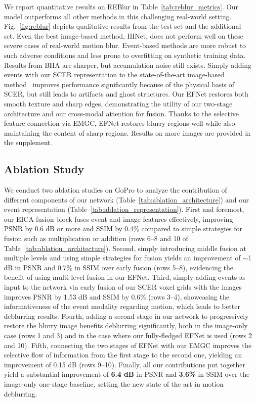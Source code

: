 \documentclass[runningheads]{llncs}
\newcommand{\PAR}[1]{\noindent{\bf #1}}
\newlength \g
\begin{document}
\PAR{REBlur dataset.}
We report quantitative results on REBlur in Table~\ref{tab:reblur_metrics}. Our model outperforms all other methods in this challenging real-world setting. Fig.~\ref{fig:reblur} depicts qualitative results from the test set and the additional set. Even the best image-based method, HINet, does not perform well on these severe cases of real-world motion blur. Event-based methods are more robust to such adverse conditions and less prone to overfitting on synthetic training data. Results from BHA are sharper, but accumulation noise still exists. Simply adding events with our SCER representation to the state-of-the-art image-based method~\cite{chen2021hinet} improves performance significantly because of the physical basis of SCER, but still leads to artifacts and ghost structures. Our EFNet restores both smooth texture and sharp edges, demonstrating the utility of our two-stage architecture and our cross-modal attention for fusion. Thanks to the selective feature connection via EMGC, EFNet restores blurry regions well while also maintaining the content of sharp regions. Results on more images are provided in the supplement.

\subsection{Ablation Study}

We conduct two ablation studies on GoPro to analyze the contribution of different components of our network (Table~\ref{tab:ablation_architecture}) and our event representation (Table~\ref{tab:ablation_representation}).
First and foremost, our EICA fusion block fuses event and image features effectively, improving PSNR by 0.6 dB or more and SSIM by 0.4\% compared to simple strategies for fusion such as multiplication or addition (rows 6--8 and 10 of Table~\ref{tab:ablation_architecture}). Second, simply introducing middle fusion at multiple levels and using simple strategies for fusion yields an improvement of $\sim$1 dB in PSNR and 0.7\% in SSIM over early fusion (rows 5--8), evidencing the benefit of using multi-level fusion in our EFNet. Third, simply adding events as input to the network via early fusion of our SCER voxel grids with the images improves PSNR by 1.53 dB and SSIM by 0.6\% (rows 3--4), showcasing the informativeness of the event modality regarding motion, which leads to better deblurring results. Fourth, adding a second stage in our network to progressively restore the blurry image benefits deblurring significantly, both in the image-only case (rows 1 and 3) and in the case where our fully-fledged EFNet is used (rows 2 and 10). Fifth, connecting the two stages of EFNet with our EMGC improves the selective flow of information from the first stage to the second one, yielding an improvement of 0.15 dB (rows 9--10). Finally, all our contributions put together yield a substantial improvement of \textbf{6.4 dB} in PSNR and \textbf{3.6\%} in SSIM over the image-only one-stage baseline, setting the new state of the art in motion deblurring.
\end{document}
